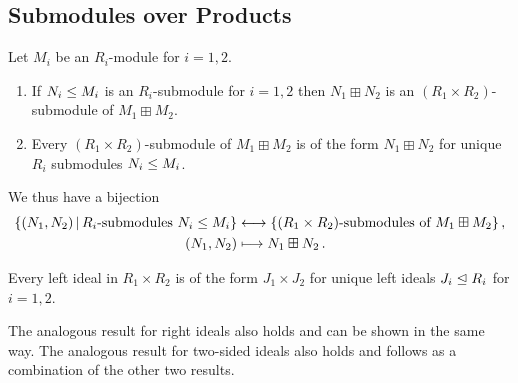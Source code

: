 




\subsection{Submodules over Products}


\begin{proposition}
  \label{proposition: submodules of products over rings}
  Let $M_i$ be an $R_i$-module for $i = 1, 2$.
  \begin{enumerate}
    \item
      If $N_i \leq M_i$ is an $R_i$-submodule for $i = 1, 2$ then $N_1 \boxplus N_2$ is an $(R_1 \times R_2)$-submodule of $M_1 \boxplus M_2$.
    \item
      Every $(R_1 \times R_2)$-submodule of $M_1 \boxplus M_2$ is of the form $N_1 \boxplus N_2$ for unique $R_i$ submodules $N_i \leq M_i$.
  \end{enumerate}
  We thus have a bijection
  \begin{align*}
    \{ (N_1, N_2) \suchthat \text{$R_i$-submodules $N_i \moduleleq M_i$} \}
    &\longleftrightarrow
    \{ \text{$(R_1 \times R_2)$-submodules of $M_1 \boxplus M_2$} \} \,,
    \\
    (N_1, N_2)
    &\longmapsto
    N_1 \boxplus N_2 \,.
  \end{align*}
\end{proposition}




\begin{corollary}
  \label{corollary: ideals in products of rings}
  Every left ideal in $R_1 \times R_2$ is of the form $J_1 \times J_2$ for unique left ideals $J_i \trianglelefteq R_i$ for $i = 1, 2$.
\end{corollary}




\begin{remark}
  \label{remark: right and two-sided ideals in products of rings}
  The analogous result for right ideals also holds and can be shown in the same way.
  The analogous result for two-sided ideals also holds and follows as a combination of the other two results.
\end{remark}


